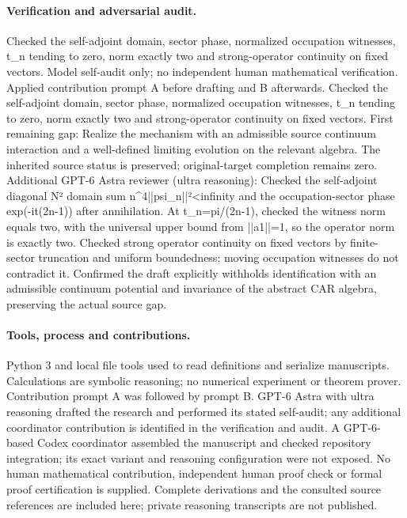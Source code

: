 \documentclass[11pt]{article}
\begin{document}
\paragraph{Verification and adversarial audit.}
Checked the self-adjoint domain, sector phase, normalized occupation witnesses, t\_n tending to zero, norm exactly two and strong-operator continuity on fixed vectors. Model self-audit only; no independent human mathematical verification. Applied contribution prompt A before drafting and B afterwards. Checked the self-adjoint domain, sector phase, normalized occupation witnesses, t\_n tending to zero, norm exactly two and strong-operator continuity on fixed vectors. First remaining gap: Realize the mechanism with an admissible source continuum interaction and a well-defined limiting evolution on the relevant algebra. The inherited source status is preserved; original-target completion remains zero. Additional GPT-6 Astra reviewer (ultra reasoning): Checked the self-adjoint diagonal N² domain sum n\textasciicircum{}4||psi\_n||²<infinity and the occupation-sector phase exp(-it(2n-1)) after annihilation. At t\_n=pi/(2n-1), checked the witness norm equals two, with the universal upper bound from ||a1||=1, so the operator norm is exactly two. Checked strong operator continuity on fixed vectors by finite-sector truncation and uniform boundedness; moving occupation witnesses do not contradict it. Confirmed the draft explicitly withholds identification with an admissible continuum potential and invariance of the abstract CAR algebra, preserving the actual source gap.

\paragraph{Tools, process and contributions.}
Python 3 and local file tools used to read definitions and serialize manuscripts. Calculations are symbolic reasoning; no numerical experiment or theorem prover. Contribution prompt A was followed by prompt B. GPT-6 Astra with ultra reasoning drafted the research and performed its stated self-audit; any additional coordinator contribution is identified in the verification and audit. A GPT-6-based Codex coordinator assembled the manuscript and checked repository integration; its exact variant and reasoning configuration were not exposed. No human mathematical contribution, independent human proof check or formal proof certification is supplied. Complete derivations and the consulted source references are included here; private reasoning transcripts are not published.
\end{document}

